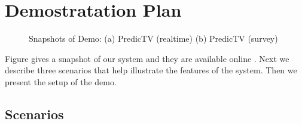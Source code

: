\section{Demostratation Plan}
\label{sec:demoplan}


\begin{figure}[h]
\begin{center}
\caption{Snapshots of Demo: (a) PredicTV (realtime) (b) PredicTV (survey)}
\label{fig:TV1TV2}
\end{center}
\end{figure}

Figure \label{fig:TV1TV2} gives a snapshot of our system and 
they are available online \cite{tv-url}. Next we describe
three scenarios that help illustrate the features of the system. Then
we present the setup of the demo. 


\subsection{Scenarios}

